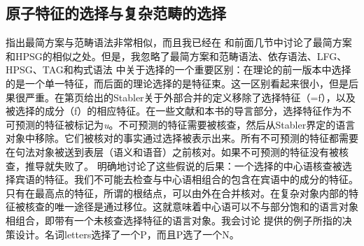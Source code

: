 \subsection{原子特征的选择与复杂范畴的选择}
\label{sec-selection-features-vs-categories}

 \citet{BE95a}指出最简方案与范畴语法非常相似，而且我已经在 和前面几节中讨论了最简方案和HPSG的相似之处。但是，我忽略了最简方案和范畴语法\indexcg、依存语法\indexdg、LFG\indexlfg、HPSG\indexhpsg、TAG\indextag 和构式语法\indexcxg
中关于选择的一个重要区别：在理论的前一版本中选择的是一个单一特征，而后面的理论选择的是特征束。这一区别看起来很小，但是后果很严重。在第\pageref{Definition-EM}页给出的Stabler关于外部合并的定义移除了选择特征（=f），以及被选择的成分（f）的相应特征。在一些文献和本书的导言部分，选择特征作为不可预测的特征被标记为\emph{u}。不可预测的特征需要被核查，然后从Stabler界定的语言对象中移除。它们被核对的事实通过选择被表示出来。所有不可预测的特征都需要在句法对象被送到表层（语义和语音）之前核对。如果不可预测的特征没有被核查，推导就失败了。 \citet[\S~3.6]{Adger2003a}明确地讨论了这些假说的后果：一个选择的中心语核查被选择宾语的特征。我们不可能去检查与中心语相组合的包含在宾语中的成分的特征。只有在最高点的特征，所谓的根结点，可以由外在合并核对。在复杂对象内部的特征被核查的唯一途径是通过移位。这就意味着中心语可以不与部分饱和的语言对象相组合，即带有一个未核查选择特征的语言对象。我会讨论 \citet[]{Adger2003a}提供的例子所指的决策设计。名词letters选择了一个P，而且P选了一个N。
